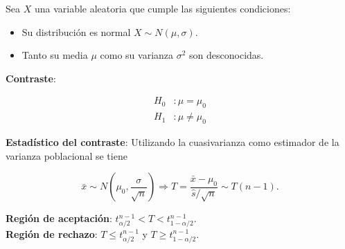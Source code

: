 \documentclass[
  a4paper,
]{scrreport}
\providecommand{\tightlist}{%
  \setlength{\itemsep}{0pt}\setlength{\parskip}{0pt}}\usepackage{longtable,booktabs,array}
\theoremstyle{plain}
\theoremstyle{definition}
\theoremstyle{definition}
\theoremstyle{remark}
\begin{document}
Sea \(X\) una variable aleatoria que cumple las siguientes condiciones:

\begin{itemize}
\tightlist
\item
  Su distribución es normal \(X\sim N(\mu,\sigma)\).
\item
  Tanto su media \(\mu\) como su varianza \(\sigma^2\) son desconocidas.
\end{itemize}

\textbf{Contraste}:

\begin{align*}
H_0 &: \mu=\mu_0 \\
H_1 &: \mu\neq \mu_0\end{align*}

\textbf{Estadístico del contraste}: Utilizando la cuasivarianza como
estimador de la varianza poblacional se tiene

\[
\bar x\sim N\left(\mu_0,\frac{\sigma}{\sqrt{n}}\right) \Rightarrow T=\frac{\bar x-\mu_0}{\hat s/\sqrt{n}}\sim T(n-1).
\]

\textbf{Región de aceptación}:
\(t^{n-1}_{\alpha/2} < T < t^{n-1}_{1-\alpha/2}\).\\
\textbf{Región de rechazo}: \(T\leq t^{n-1}_{\alpha/2}\) y
\(T\geq t^{n-1}_{1-\alpha/2}\).
\end{document}
